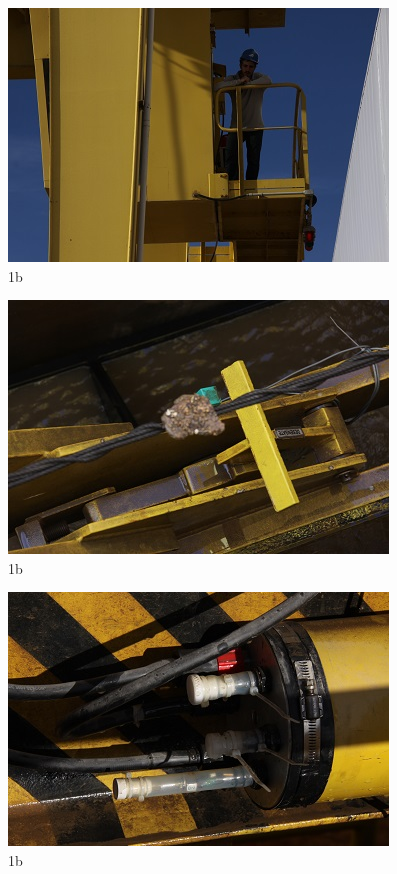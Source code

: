 \begin{figure}[h!]
  \centering
  \includegraphics[width=1\linewidth]{Fotos/Janeiro2015/15.jpg}
  \caption{1b}
  \label{nov20136}
\end{figure}

\begin{figure}[h!]
  \centering
  \includegraphics[width=1\linewidth]{Fotos/Janeiro2015/16.jpg}
  \caption{1b}
  \label{nov20136}
\end{figure}

\begin{figure}[h!]
  \centering
  \includegraphics[width=1\linewidth]{Fotos/Janeiro2015/17.jpg}
  \caption{1b}
  \label{nov20136}
\end{figure}

